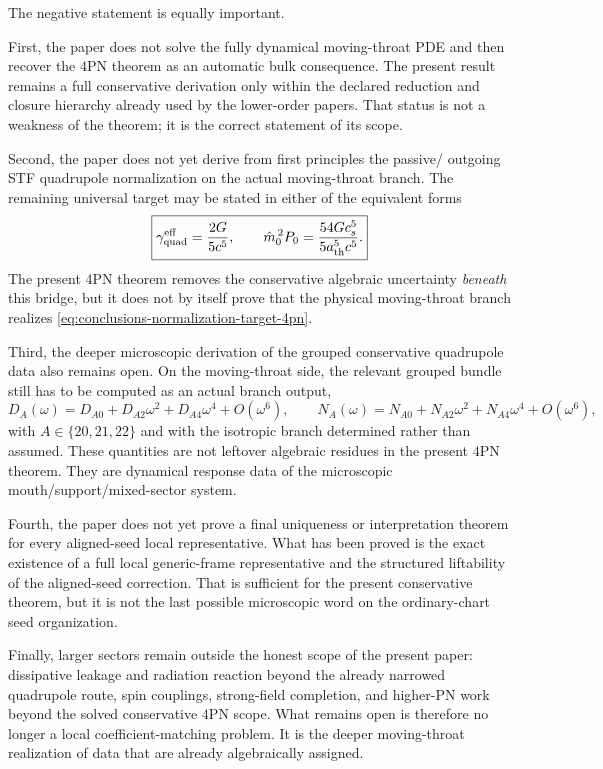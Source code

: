 \documentclass[11pt]{article}
\begin{document}
The negative statement is equally important.

First, the paper does not solve the fully dynamical moving-throat PDE and then
recover the $4$PN theorem as an automatic bulk consequence.  The present result
remains a full conservative derivation only within the declared reduction and
closure hierarchy already used by the lower-order papers.  That status is not a
weakness of the theorem; it is the correct statement of its scope.

Second, the paper does not yet derive from first principles the passive/
outgoing STF quadrupole normalization on the actual moving-throat branch.  The
remaining universal target may be stated in either of the equivalent forms
\begin{equation}
\boxed{
\gamma_{\rm quad}^{\rm eff}=\frac{2G}{5c^5},
\qquad
\hat m_0^{\,2}P_0=\frac{54Gc_s^5}{5a_{\rm th}^5c^5}.
}
\label{eq:conclusions-normalization-target-4pn}
\end{equation}
The present $4$PN theorem removes the conservative algebraic uncertainty
\emph{beneath} this bridge, but it does not by itself prove that the physical
moving-throat branch realizes \eqref{eq:conclusions-normalization-target-4pn}.

Third, the deeper microscopic derivation of the grouped conservative quadrupole
data also remains open.  On the moving-throat side, the relevant grouped bundle
still has to be computed as an actual branch output,
\begin{equation}
D_A(\omega)=D_{A0}+D_{A2}\omega^2+D_{A4}\omega^4+O(\omega^6),
\qquad
N_A(\omega)=N_{A0}+N_{A2}\omega^2+N_{A4}\omega^4+O(\omega^6),
\label{eq:conclusions-grouped-bundle-open}
\end{equation}
with $A\in\{20,21,22\}$ and with the isotropic branch determined rather than
assumed.  These quantities are not leftover algebraic residues in the present
$4$PN theorem.  They are dynamical response data of the microscopic
mouth/support/mixed-sector system.

Fourth, the paper does not yet prove a final uniqueness or interpretation theorem
for every aligned-seed local representative.  What has been proved is the exact
existence of a full local generic-frame representative and the structured
liftability of the aligned-seed correction.  That is sufficient for the present
conservative theorem, but it is not the last possible microscopic word on the
ordinary-chart seed organization.

Finally, larger sectors remain outside the honest scope of the present paper:
dissipative leakage and radiation reaction beyond the already narrowed
quadrupole route, spin couplings, strong-field completion, and higher-PN work
beyond the solved conservative $4$PN scope.  What remains open is therefore no
longer a local coefficient-matching problem.  It is the deeper moving-throat
realization of data that are already algebraically assigned.
\end{document}
